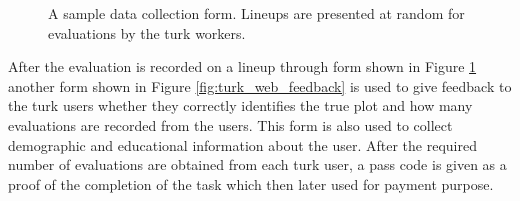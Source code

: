 \documentclass[11pt]{article}
\begin{document}
\begin{figure}[hbtp]
   \centering
       \caption{A sample data collection form. Lineups are presented at random for evaluations by the turk workers.}
       \label{fig:turk_web}
\end{figure}

After the evaluation is recorded on a lineup through form shown in Figure \ref{fig:turk_web} another form shown in Figure \ref{fig:turk_web_feedback} is used to give feedback to the turk users whether they correctly identifies the true plot and how many evaluations are recorded from the users. This form is also used to collect demographic and educational information about the user. After the required number of evaluations are obtained from each turk user, a pass code is given as a proof of the completion of the task which then later used for payment purpose.
\end{document}

